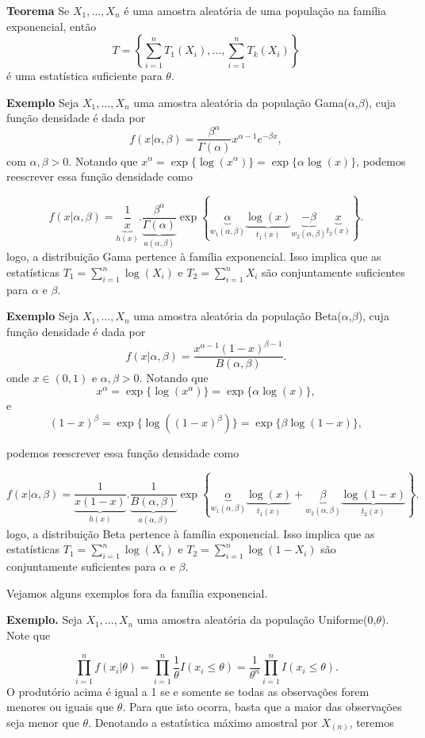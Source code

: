 \documentclass[
  letterpaper,
  DIV=11,
  numbers=noendperiod]{scrartcl}
\begin{document}
\textbf{Teorema} Se \(X_1,\ldots,X_n\) é uma amostra aleatória de uma
população na família exponencial, então
\[T=\left\{\sum_{i=1}^n T_1(X_i),\ldots,\sum_{i=1}^n T_k(X_i)\right\}\]
é uma estatística suficiente para \(\theta\).

\textbf{Exemplo} Seja \(X_1,\ldots,X_n\) uma amostra aleatória da
população Gama(\(\alpha\),\(\beta\)), cuja função densidade é dada por
\[f(x|\alpha,\beta)=\frac{\beta^\alpha}{\Gamma(\alpha)}x^{\alpha-1}e^{-\beta x},\]
com \(\alpha,\beta>0\). Notando que
\(x^\alpha=\exp\{\log(x^\alpha)\}=\exp\{\alpha\log(x)\}\), podemos
reescrever essa função densidade como

\[f(x|\alpha,\beta)=\underbrace{\frac{1}{x}}_{h(x)}.\underbrace{\frac{\beta^\alpha}{\Gamma(\alpha)}}_{a(\alpha,\beta)}\exp\left\{\underbrace{\alpha}_{w_1(\alpha,\beta)}\underbrace{\log(x)}_{t_1(x)}\underbrace{-\beta}_{w_2(\alpha,\beta)} \underbrace{x}_{t_2(x)}\right\}.\]
logo, a distribuição Gama pertence à família exponencial. Isso implica
que as estatísticas \(T_1=\sum_{i=1}^n \log(X_i)\) e
\(T_2=\sum_{i=1}^n X_i\) são conjuntamente suficientes para \(\alpha\) e
\(\beta\).

\textbf{Exemplo} Seja \(X_1,\ldots,X_n\) uma amostra aleatória da
população Beta(\(\alpha\),\(\beta\)), cuja função densidade é dada por
\[f(x|\alpha,\beta)=\frac{x^{\alpha-1}(1-x)^{\beta-1}}{B(\alpha,\beta)}.\]
onde \(x\in(0,1)\) e \(\alpha,\beta>0\). Notando que
\[x^\alpha=\exp\{\log(x^\alpha)\}=\exp\{\alpha\log(x)\},\] e
\[(1-x)^\beta=\exp\{\log((1-x)^\beta)\}=\exp\{\beta\log(1-x)\},\]

podemos reescrever essa função densidade como

\[f(x|\alpha,\beta)=\underbrace{\frac{1}{x(1-x)}}_{h(x)}.\underbrace{\frac{1}{B(\alpha,\beta)}}_{a(\alpha,\beta)}\exp\left\{\underbrace{\alpha}_{w_1(\alpha,\beta)}\underbrace{\log(x)}_{t_1(x)}+\underbrace{\beta}_{w_2(\alpha,\beta)} \underbrace{\log(1-x)}_{t_2(x)}\right\}.\]
logo, a distribuição Beta pertence à família exponencial. Isso implica
que as estatísticas \(T_1=\sum_{i=1}^n \log(X_i)\) e
\(T_2=\sum_{i=1}^n \log(1-X_i)\) são conjuntamente suficientes para
\(\alpha\) e \(\beta\).

Vejamos alguns exemplos fora da família exponencial.

\textbf{Exemplo.} Seja \(X_1,\ldots,X_n\) uma amostra aleatória da
população Uniforme(0,\(\theta\)). Note que

\[\prod_{i=1}^n f(x_i|\theta)=\prod_{i=1}^n \frac{1}{\theta}I(x_i\leq \theta)=\frac{1}{\theta^n}\prod_{i=1}^{n}I(x_i\leq \theta).\]
O produtório acima é igual a 1 se e somente se todas as observações
forem menores ou iguais que \(\theta\). Para que isto ocorra, basta que
a maior das observações seja menor que \(\theta\). Denotando a
estatística máximo amostral por \(X_{(n)}\), teremos
\end{document}
